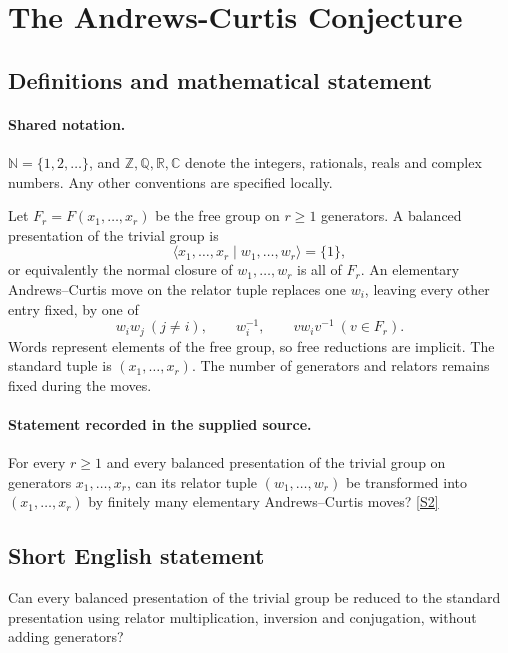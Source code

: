 \documentclass[11pt]{article}
\newcommand{\sref}[2]{\hyperlink{source:#1:#2}{[S#2]}}
\begin{document}
\section{The Andrews-Curtis Conjecture}\label{statement}

\subsection{Definitions and mathematical statement}

\paragraph{Shared notation.}$\mathbb N=\{1,2,\ldots\}$, and $\mathbb Z,\mathbb Q,\mathbb R,\mathbb C$ denote the integers, rationals, reals and complex numbers. Any other conventions are specified locally.


Let \(F_r=F(x_1,\ldots,x_r)\) be the free group on \(r\ge1\)
generators.  A balanced presentation of the trivial group is
\[
 \langle x_1,\ldots,x_r\mid w_1,\ldots,w_r\rangle=\{1\},
\]
or equivalently the normal closure of \(w_1,\ldots,w_r\) is all of
\(F_r\).  An elementary Andrews--Curtis move on the relator tuple
replaces one \(w_i\), leaving every other entry fixed, by one of
\[
 w_iw_j\ (j\ne i),\qquad w_i^{-1},\qquad
 v w_i v^{-1}\ (v\in F_r).
\]
Words represent elements of the free group, so free reductions are implicit.
The standard tuple is \((x_1,\ldots,x_r)\).
The number of generators and relators remains fixed during the moves.
\paragraph{Statement recorded in the supplied source.}
For every \(r\ge1\) and every balanced presentation of the trivial
group on generators \(x_1,\ldots,x_r\), can its relator tuple
\((w_1,\ldots,w_r)\) be transformed into
\((x_1,\ldots,x_r)\) by finitely many elementary
Andrews--Curtis moves? \sref{statement}{2}
\subsection{Short English statement}
Can every balanced presentation of the trivial group be reduced to the standard presentation using relator multiplication, inversion and conjugation, without adding generators?
\end{document}

